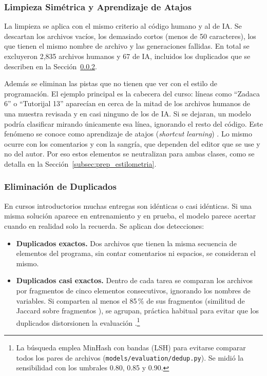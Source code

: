 \subsubsection{Limpieza Simétrica y Aprendizaje de Atajos}
\label{subsec:limpieza_simetrica}

La limpieza se aplica con el mismo criterio al código humano y al de IA. Se descartan los archivos vacíos, los demasiado cortos (menos de 50 caracteres), los que tienen el mismo nombre de archivo y las generaciones fallidas. En total se excluyeron 2,835 archivos humanos y 67 de IA, incluidos los duplicados que se describen en la Sección~\ref{subsec:deduplicacion}.

Además se eliminan las pistas que no tienen que ver con el estilo de programación. El ejemplo principal es la cabecera del curso: líneas como ``Zadaca 6'' o ``Tutorijal 13'' aparecían en cerca de la mitad de los archivos humanos de una muestra revisada y en casi ninguno de los de IA. Si se dejaran, un modelo podría clasificar mirando únicamente esa línea, ignorando el resto del código. Este fenómeno se conoce como aprendizaje de atajos (\textit{shortcut learning}) \cite{Geirhos2020Shortcut}. Lo mismo ocurre con los comentarios y con la sangría, que dependen del editor que se use y no del autor. Por eso estos elementos se neutralizan para ambas clases, como se detalla en la Sección~\ref{subsec:prep_estilometria}.

\subsubsection{Eliminación de Duplicados}
\label{subsec:deduplicacion}

En cursos introductorios muchas entregas son idénticas o casi idénticas. Si una misma solución aparece en entrenamiento y en prueba, el modelo parece acertar cuando en realidad solo la recuerda. Se aplican dos detecciones:

\begin{itemize}
    \item \textbf{Duplicados exactos.} Dos archivos que tienen la misma secuencia de elementos del programa, sin contar comentarios ni espacios, se consideran el mismo.
    \item \textbf{Duplicados casi exactos.} Dentro de cada tarea se comparan los archivos por fragmentos de cinco elementos consecutivos, ignorando los nombres de variables. Si comparten al menos el 85\,\% de sus fragmentos (similitud de Jaccard sobre fragmentos \cite{Broder1997Resemblance}), se agrupan, práctica habitual para evitar que los duplicados distorsionen la evaluación \cite{Lee2022Dedup}.\footnote{La búsqueda emplea MinHash con bandas (LSH) \cite{Broder1997Resemblance} para evitarse comparar todos los pares de archivos (\texttt{models/evaluation/dedup.py}). Se midió la sensibilidad con los umbrales 0.80, 0.85 y 0.90.}
\end{itemize}

